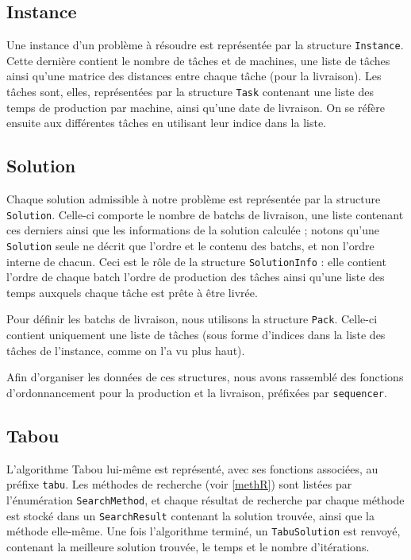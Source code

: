 \documentclass[hideweeklyreports]{polytech/polytech}
\newcommand{\codec}[1]{\texttt{#1}}
\begin{document}
			\subsection{Instance}
				Une instance d'un problème à résoudre est représentée par la structure \codec{Instance}. Cette dernière contient le nombre de tâches et de machines, une liste de tâches ainsi qu'une matrice des distances entre chaque tâche (pour la livraison).
				Les tâches sont, elles, représentées par la structure \codec{Task} contenant une liste des temps de production par machine, ainsi qu'une date de livraison. On se réfère ensuite aux différentes tâches en utilisant leur indice dans la liste.
				
			\subsection{Solution}
				Chaque solution admissible à notre problème est représentée par la structure \codec{Solution}. Celle-ci comporte le nombre de batchs de livraison, une liste contenant ces derniers ainsi que les informations de la solution calculée ; notons qu'une \codec{Solution} seule ne décrit que l'ordre et le contenu des batchs, et non l'ordre interne de chacun. Ceci est le rôle de la structure \codec{SolutionInfo} : elle contient l'ordre de chaque batch l'ordre de production des tâches ainsi qu'une liste des temps auxquels chaque tâche est prête à être livrée.
				
				Pour définir les batchs de livraison, nous utilisons la structure \codec{Pack}. Celle-ci contient uniquement une liste de tâches (sous forme d'indices dans la liste des tâches de l'instance, comme on l'a vu plus haut).
				
				Afin d'organiser les données de ces structures, nous avons rassemblé des fonctions d'ordonnancement pour la production et la livraison, préfixées par \codec{sequencer}.
				
			\subsection{Tabou}
				L'algorithme Tabou lui-même est représenté, avec ses fonctions associées, au préfixe \codec{tabu}. Les méthodes de recherche (voir \autoref{methR}) sont listées par l'énumération \codec{SearchMethod}, et chaque résultat de recherche par chaque méthode est stocké dans un \codec{SearchResult} contenant la solution trouvée, ainsi que la méthode elle-même. Une fois l'algorithme terminé, un \codec{TabuSolution} est renvoyé, contenant la meilleure solution trouvée, le temps et le nombre d'itérations.
				
\end{document}
